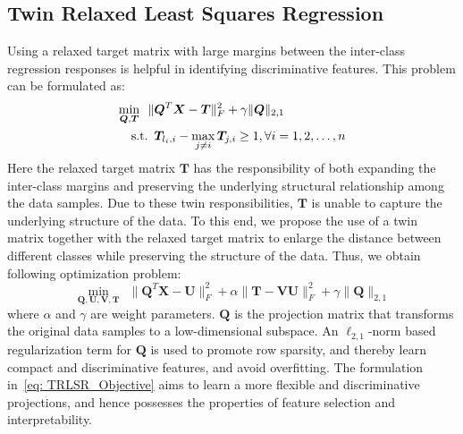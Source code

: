 \subsection{Twin Relaxed Least Squares Regression}
%
Using a relaxed target matrix with large margins between the inter-class regression responses is helpful in identifying discriminative features. This problem can be formulated as:
%
\begin{equation}
\begin{split}
       \label{eq: TRLSR_OBJ_with_T}
    \underset{\bm{Q},\bm{T}}{\min} \ \ \| & \bm{Q}^{T}\bm{X} - \bm{T} \|_{F}^{2} + \gamma \| \bm{Q}\|_{2,1}  \\
      \text{s.t.} \enskip & \bm{T}_{l_{i}, i} - \max_{j \neq i} \bm{T}_{j,i} \geq 1, \forall i = 1,2,\dots,n
\end{split}
\end{equation}
%
Here the relaxed target matrix $\bm{T}$ has the responsibility of both expanding the inter-class margins and preserving the underlying structural relationship among the data samples. Due to these twin responsibilities, $\bm{T}$ is unable to capture the underlying structure of the data. To this end, we propose the use of a twin matrix together with the relaxed target matrix to enlarge the distance between different classes while preserving the structure of the data. Thus, we obtain following optimization problem:
\begin{equation}
    \label{eq: TRLSR_Objective}
         \underset{\bm{Q},\bm{U},\bm{V}, \bm{T}}{\min} \ \ \| \bm{Q}^{T}\bm{X} - \bm{U} \|_{F}^{2} + \alpha \| \bm{T} - \bm{V} \bm{U}\|_{F}^{2} + \gamma \| \bm{Q}\|_{2,1} 
\end{equation}
where $\alpha$ and $\gamma$ are weight parameters. $\bm{Q}$ is the projection matrix that transforms the original data samples to a low-dimensional subspace. An $\ell_{2,1}$-norm based regularization term for $\bm{Q}$ is used to promote row sparsity, and thereby learn compact and discriminative features, and avoid overfitting. The formulation in~\eqref{eq: TRLSR_Objective} aims to learn a more flexible and discriminative projections, and hence possesses the properties of feature selection and interpretability. 


